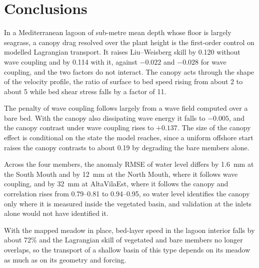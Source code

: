 \section{Conclusions}
\label{sec:conclusions}

In a Mediterranean lagoon of sub-metre mean depth whose floor is largely
seagrass, a canopy drag resolved over the plant height is the first-order
control on modelled Lagrangian transport. It raises Liu--Weisberg skill by
0.120 without wave coupling and by 0.114 with it, against $-0.022$ and
$-0.028$ for wave coupling, and the two factors do not interact. The canopy
acts through the shape of the velocity profile, the ratio of surface to bed
speed rising from about 2 to about 5 while bed shear stress falls by a factor
of 11.

The penalty of wave coupling follows largely from a wave field computed over a
bare bed. With the canopy also dissipating wave energy it falls to $-0.005$,
and the canopy contrast under wave coupling rises to $+0.137$. The size of the
canopy effect is conditional on the state the model reaches, since a uniform
offshore start raises the canopy contrasts to about 0.19 by degrading the bare
members alone.

Across the four members, the anomaly RMSE of water level differs by 1.6~mm at
the South Mouth and by 12~mm at the North Mouth, where it follows wave
coupling, and by 32~mm at AltaVilaEst, where it follows the canopy and
correlation rises from 0.79--0.81 to 0.94--0.95, so water level identifies the
canopy only where it is measured inside the vegetated basin, and validation at
the inlets alone would not have identified it.

With the mapped meadow in place, bed-layer speed in the lagoon interior falls
by about 72\% and the Lagrangian skill of vegetated and bare members no longer
overlaps, so the transport of a shallow basin of this type depends on its
meadow as much as on its geometry and forcing.
